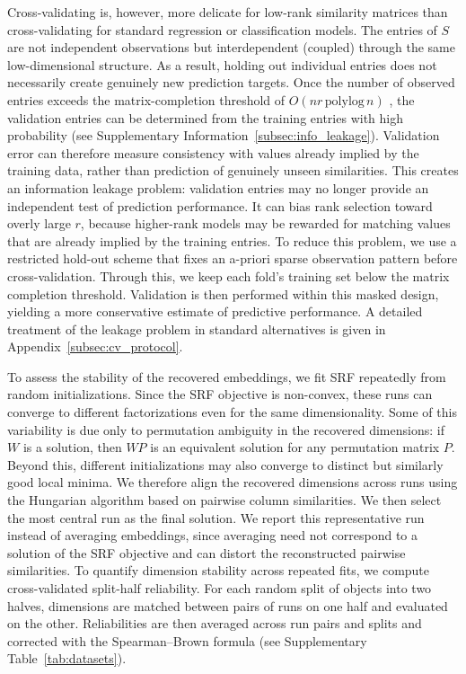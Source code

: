 \documentclass{article}
\begin{document}
Cross-validating is, however, more delicate for low-rank similarity matrices than cross-validating for standard regression or classification models. The entries of $S$ are not independent observations but interdependent (coupled) through the same low-dimensional structure. As a result, holding out individual entries does not necessarily create genuinely new prediction targets.  Once the number of observed entries exceeds the matrix-completion threshold of $O(nr\,\mathrm{polylog}\,n)$ \citep{CandesRecht2009, Gross2011}, the validation entries can be determined from the training entries with high probability (see Supplementary Information~\ref{subsec:info_leakage}). Validation error can therefore measure consistency with values already implied by the training data, rather than prediction of genuinely unseen similarities. This creates an information leakage problem: validation entries may no longer provide an independent test of prediction performance. It can bias rank selection toward overly large $r$, because higher-rank models may be rewarded for matching values that are already implied by the training entries. To reduce this problem, we use a restricted hold-out scheme that fixes an a-priori sparse observation pattern before cross-validation. Through this, we keep each fold's training set below the matrix completion threshold. Validation is then performed within this masked design, yielding a more conservative estimate of predictive performance. A detailed treatment of the leakage problem in standard alternatives is given in Appendix~\ref{subsec:cv_protocol}.

To assess the stability of the recovered embeddings, we fit SRF repeatedly from random initializations. Since the SRF objective is non-convex, these runs can converge to different factorizations even for the same dimensionality. Some of this variability is due only to permutation ambiguity in the recovered dimensions: if $W$ is a solution, then $W P$ is an equivalent solution for any permutation matrix $P$. Beyond this, different initializations may also converge to distinct but similarly good local minima. We therefore align the recovered dimensions across runs using the Hungarian algorithm based on pairwise column similarities. We then select the most central run as the final solution. We report this representative run instead of averaging embeddings, since averaging need not correspond to a solution of the SRF objective and can distort the reconstructed pairwise similarities. To quantify dimension stability across repeated fits, we compute cross-validated split-half reliability. For each random split of objects into two halves, dimensions are matched between pairs of runs on one half and evaluated on the other. Reliabilities are then averaged across run pairs and splits and corrected with the Spearman--Brown formula (see Supplementary Table~\ref{tab:datasets}).
\end{document}
